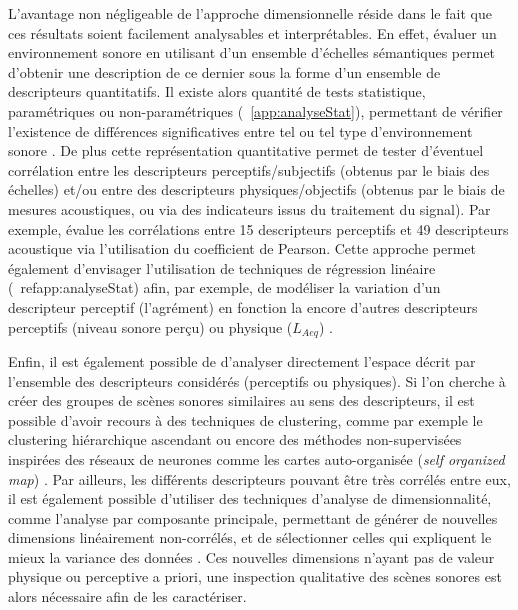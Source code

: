 L'avantage non négligeable de l'approche dimensionnelle réside dans le fait que ces résultats soient facilement analysables et interprétables. En effet, évaluer un environnement sonore  en utilisant d'un ensemble d'échelles sémantiques permet d'obtenir une description de ce dernier sous la forme d'un ensemble de descripteurs quantitatifs. Il existe alors quantité de tests statistique, paramétriques ou non-paramétriques (\Cf~\ref{app:analyseStat}), permettant de vérifier l'existence de différences significatives entre tel ou tel type d'environnement sonore \citep{hong2013designing}. De plus cette représentation quantitative permet de tester d'éventuel corrélation entre les descripteurs perceptifs/subjectifs (obtenus par le biais des échelles) et/ou entre des descripteurs physiques/objectifs (obtenus par le biais de mesures acoustiques, ou via des indicateurs issus du traitement du signal). Par exemple, \citep{torija2013application} évalue les corrélations entre 15 descripteurs perceptifs et 49 descripteurs acoustique via l'utilisation du coefficient de Pearson. Cette approche permet également d'envisager l'utilisation de techniques de régression linéaire (\Cf~ref{app:analyseStat}) afin, par exemple, de modéliser la variation d'un descripteur perceptif (l'agrément) en fonction la encore d'autres descripteurs perceptifs (niveau sonore perçu) ou physique ($L_{Aeq}$) \citep{lavandier2006contribution,ricciardi2015sound}.

Enfin, il est également possible de d'analyser directement l'espace décrit par l'ensemble des descripteurs considérés (perceptifs ou physiques). Si l'on cherche à créer des groupes de scènes sonores similaires au sens des descripteurs, il est possible d'avoir recours à des techniques de clustering, comme par exemple le clustering hiérarchique ascendant \citep{torija2013application} ou encore des méthodes non-supervisées inspirées des réseaux de neurones comme les cartes auto-organisée (\emph{self organized map}) \citep{ricciardi2015sound}. Par ailleurs, les différents descripteurs pouvant être très corrélés entre eux, il est également possible d'utiliser des techniques d'analyse de dimensionnalité, comme l'analyse par composante principale, permettant de générer de nouvelles dimensions linéairement non-corrélés, et de sélectionner celles qui expliquent le mieux la variance des données \citep{cain2013development,torija2013application}. Ces nouvelles dimensions n'ayant pas de valeur physique ou perceptive a priori, une inspection qualitative des scènes sonores est alors nécessaire afin de les caractériser.

